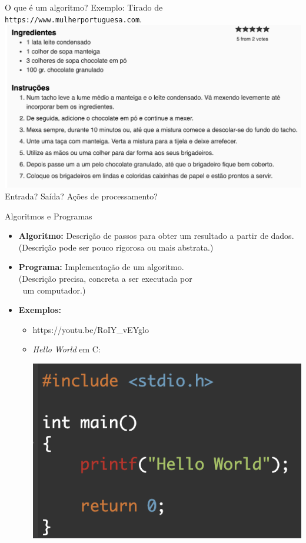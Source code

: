 \documentclass[handout,t]{beamer}
\begin{document}
\begin{frame}{O que é um algoritmo?}
Exemplo: Tirado de \texttt{https://www.mulherportuguesa.com}.
\includegraphics[scale=0.27]{figuras/Brigadeiro.png}
Entrada? Saída? Ações de processamento?
\end{frame}

\begin{frame}{Algoritmos e Programas}
\begin{itemize}
    \item \textbf{Algoritmo:} Descrição de passos para obter um resultado a partir de dados. 
    \\ \qquad (Descrição pode ser pouco rigorosa ou mais abstrata.)
    \item \textbf{Programa:} Implementação de um algoritmo.
    \\ \qquad (Descrição precisa, concreta a ser executada por 
    \\ \qquad \ um computador.)
    \item \textbf{Exemplos:}
    \begin{itemize}
        \item https://youtu.be/RoIY\_vEYglo \item \textit{Hello World} em C: 
        
        \qquad\qquad\qquad\qquad
        \includegraphics[scale=0.4]{figuras/helloworld.png}
    \end{itemize}
\end{itemize}
\end{frame}
\end{document}
